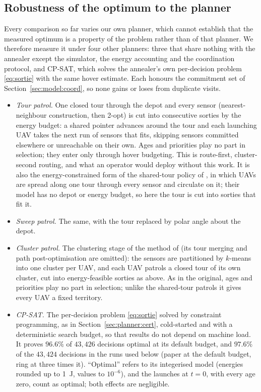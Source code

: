 \documentclass[journal,outdir=./]{IEEEtran}
\begin{document}
\subsection{Robustness of the optimum to the planner}\label{sec:eval:baseline}
Every comparison so far varies our own planner, which cannot establish that the measured optimum is a property of the problem rather than of that planner. We therefore measure it under four other planners: three that share nothing with the annealer except the simulator, the energy accounting and the coordination protocol, and CP-SAT, which solves the annealer's own per-decision problem \eqref{eq:sortie} with the same hover estimate. Each honours the commitment set of Section~\ref{sec:model:coord}, so none gains or loses from duplicate visits.
\begin{itemize}
\item \emph{Tour patrol.} One closed tour through the depot and every sensor (nearest-neighbour construction, then 2-opt) is cut into consecutive sorties by the energy budget: a shared pointer advances around the tour and each launching UAV takes the next run of sensors that fits, skipping sensors committed elsewhere or unreachable on their own. Ages and priorities play no part in selection; they enter only through hover budgeting. This is route-first, cluster-second routing, and what an operator would deploy without this work. It is also the energy-constrained form of the shared-tour policy of \cite{rahimi2024graph}, in which UAVs are spread along one tour through every sensor and circulate on it; their model has no depot or energy budget, so here the tour is cut into sorties that fit it.
\item \emph{Sweep patrol.} The same, with the tour replaced by polar angle about the depot.
\item \emph{Cluster patrol.} The clustering stage of the method of \cite{rahimi2024graph} (its tour merging and path post-optimisation are omitted): the sensors are partitioned by $k$-means into one cluster per UAV, and each UAV patrols a closed tour of its own cluster, cut into energy-feasible sorties as above. As in the original, ages and priorities play no part in selection; unlike the shared-tour patrols it gives every UAV a fixed territory.
\item \emph{CP-SAT.} The per-decision problem \eqref{eq:sortie} solved by constraint programming, as in Section~\ref{sec:planner:cert}, cold-started and with a deterministic search budget, so that results do not depend on machine load. It proves $96.6\%$ of $43{,}426$ decisions optimal at its default budget, and $97.6\%$ of the $43{,}424$ decisions in the runs used below (paper at the default budget, ring at three times it). ``Optimal'' refers to its integerised model (energies rounded up to 1~J, values to $10^{-6}$), and the launches at $t=0$, with every age zero, count as optimal; both effects are negligible.
\end{itemize}
\end{document}
